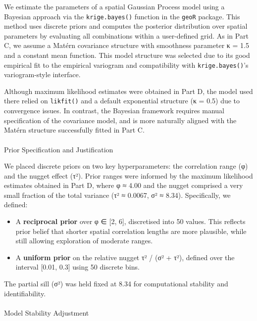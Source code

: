 \documentclass[
  11pt,
]{article}
\makeatletter
\let\oldparagraph\paragraph
\renewcommand{\paragraph}{
    \@ifstar
      \xxxParagraphStar
      \xxxParagraphNoStar
  }
\newcommand{\xxxParagraphStar}[1]{\oldparagraph*{#1}\mbox{}}
\newcommand{\xxxParagraphNoStar}[1]{\oldparagraph{#1}\mbox{}}
\providecommand{\tightlist}{%
  \setlength{\itemsep}{0pt}\setlength{\parskip}{0pt}}\usepackage{longtable,booktabs,array}
\makeatother
\begin{document}
We estimate the parameters of a spatial Gaussian Process model using a
Bayesian approach via the \texttt{krige.bayes()} function in the
\texttt{geoR} package. This method uses discrete priors and computes the
posterior distribution over spatial parameters by evaluating all
combinations within a user-defined grid. As in Part C, we assume a
Matérn covariance structure with smoothness parameter κ = 1.5 and a
constant mean function. This model structure was selected due to its
good empirical fit to the empirical variogram and compatibility with
\texttt{krige.bayes()}'s variogram-style interface.

Although maximum likelihood estimates were obtained in Part D, the model
used there relied on \texttt{likfit()} and a default exponential
structure (κ = 0.5) due to convergence issues. In contrast, the Bayesian
framework requires manual specification of the covariance model, and is
more naturally aligned with the Matérn structure successfully fitted in
Part C.

\paragraph{Prior Specification and
Justification}\label{prior-specification-and-justification}

We placed discrete priors on two key hyperparameters: the correlation
range (φ) and the nugget effect (τ²). Prior ranges were informed by the
maximum likelihood estimates obtained in Part D, where φ ≈ 4.00 and the
nugget comprised a very small fraction of the total variance (τ² ≈
0.0067, σ² ≈ 8.34). Specifically, we defined:

\begin{itemize}
\tightlist
\item
  A \textbf{reciprocal prior} over φ ∈ {[}2, 6{]}, discretised into 50
  values. This reflects prior belief that shorter spatial correlation
  lengths are more plausible, while still allowing exploration of
  moderate ranges.
\item
  A \textbf{uniform prior} on the relative nugget τ² / (σ² + τ²),
  defined over the interval {[}0.01, 0.3{]} using 50 discrete bins.
\end{itemize}

The partial sill (σ²) was held fixed at 8.34 for computational stability
and identifiability.

\paragraph{Model Stability Adjustment}\label{model-stability-adjustment}
\end{document}
